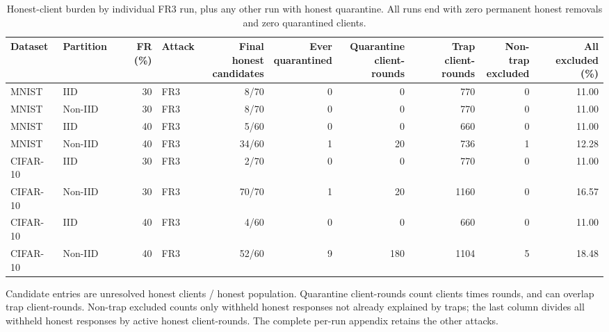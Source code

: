 \begin{table}[t]
\centering\footnotesize\setlength{\tabcolsep}{4pt}
\caption{Honest-client burden by individual FR3 run, plus any other run with honest quarantine. All runs end with zero permanent honest removals and zero quarantined clients.}\label{tab:safety}
\begin{tabular}{llrlrrrrrr}
\toprule
Dataset & Partition & FR (\%) & Attack & \shortstack{Final honest\\candidates} & \shortstack{Ever\\quarantined} & \shortstack{Quarantine\\client-rounds} & \shortstack{Trap\\client-rounds} & \shortstack{Non-trap\\excluded} & \shortstack{All excluded\\(\%)} \\
\midrule
MNIST & IID & 30 & FR3 & 8/70 & 0 & 0 & 770 & 0 & 11.00 \\
MNIST & Non-IID & 30 & FR3 & 8/70 & 0 & 0 & 770 & 0 & 11.00 \\
MNIST & IID & 40 & FR3 & 5/60 & 0 & 0 & 660 & 0 & 11.00 \\
MNIST & Non-IID & 40 & FR3 & 34/60 & 1 & 20 & 736 & 1 & 12.28 \\
CIFAR-10 & IID & 30 & FR3 & 2/70 & 0 & 0 & 770 & 0 & 11.00 \\
CIFAR-10 & Non-IID & 30 & FR3 & 70/70 & 1 & 20 & 1160 & 0 & 16.57 \\
CIFAR-10 & IID & 40 & FR3 & 4/60 & 0 & 0 & 660 & 0 & 11.00 \\
CIFAR-10 & Non-IID & 40 & FR3 & 52/60 & 9 & 180 & 1104 & 5 & 18.48 \\
\bottomrule
\end{tabular}
\par\smallskip\begin{minipage}{0.96\textwidth}\scriptsize Candidate entries are unresolved honest clients / honest population. Quarantine client-rounds count clients times rounds, and can overlap trap client-rounds. Non-trap excluded counts only withheld honest responses not already explained by traps; the last column divides all withheld honest responses by active honest client-rounds. The complete per-run appendix retains the other attacks.\end{minipage}
\end{table}
